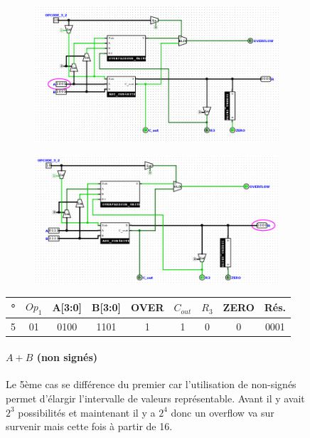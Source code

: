 \documentclass[a4paper]{article}
\begin{document}
\begin{tcolorbox}[colframe=Monokaimagenta,colback=white]

\begin{figure}[H]
    \centering
    
    \begin{subfigure}{.7\textwidth}
        \centering
        \includegraphics[width=.8\linewidth]{src/ADDSUB_TEST_AmoB.png}
        \label{fig:COMPARATEUR_EXEMPLE}
   \end{subfigure}
   
   \begin{subfigure}{.7\textwidth}
        \centering
        \includegraphics[width=.8\linewidth]{src/ADDSUB_TEST_AmoB1.png}
        \label{fig:COMPARATEUR_EXEMPLE_1}
   \end{subfigure}



\begin{tabular}{|c|c|c|c||c|c|c|c|c|}
    \hline
     ° & $Op_1$ & A[3:0] & B[3:0] & OVER & $C_{out}$ & $R_3$ & ZERO & Rés. \\
    \hline
    5  & 01     & 0100   & 1101   & 1    &  1        &   0   &  0   & 0001\\
    \hline
    
\end{tabular}

\paragraph{$A+B$ (non signés)}
Le 5ème cas se différence du premier car l'utilisation de non-signés permet d'élargir l'intervalle de valeurs représentable. Avant il y avait $2^3$ possibilités et maintenant il y a $2^4$ donc un overflow va sur survenir mais cette fois à partir de 16.\\



\end{figure}
\end{tcolorbox}
\end{document}
